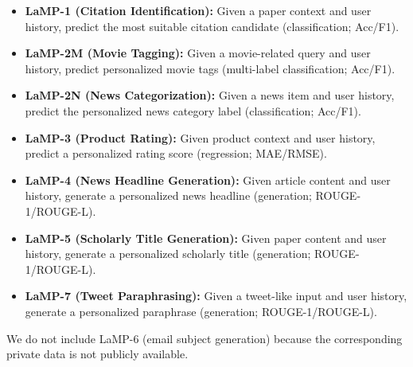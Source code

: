 \documentclass[11pt]{article}
\begin{document}
\begin{itemize}
    \setlength{\itemsep}{2pt}
    \item \textbf{LaMP-1 (Citation Identification):} Given a paper context and user history, predict the most suitable citation candidate (classification; Acc/F1).
    \item \textbf{LaMP-2M (Movie Tagging):} Given a movie-related query and user history, predict personalized movie tags (multi-label classification; Acc/F1).
    \item \textbf{LaMP-2N (News Categorization):} Given a news item and user history, predict the personalized news category label (classification; Acc/F1).
    \item \textbf{LaMP-3 (Product Rating):} Given product context and user history, predict a personalized rating score (regression; MAE/RMSE).
    \item \textbf{LaMP-4 (News Headline Generation):} Given article content and user history, generate a personalized news headline (generation; ROUGE-1/ROUGE-L).
    \item \textbf{LaMP-5 (Scholarly Title Generation):} Given paper content and user history, generate a personalized scholarly title (generation; ROUGE-1/ROUGE-L).
    \item \textbf{LaMP-7 (Tweet Paraphrasing):} Given a tweet-like input and user history, generate a personalized paraphrase (generation; ROUGE-1/ROUGE-L).
\end{itemize}

\noindent We do not include LaMP-6 (email subject generation) because the corresponding private data is not publicly available.
\end{document}
